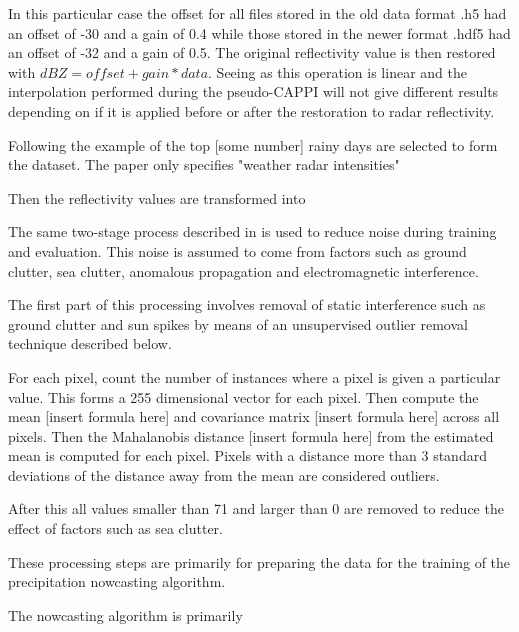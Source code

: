 In this particular case the offset for all files stored in the old data format .h5 had an offset of -30 and a gain of 0.4 while those stored in the newer format .hdf5 had an offset of -32 and a gain of 0.5. The original reflectivity value is then restored with $dBZ = offset + gain * data$. Seeing as this operation is linear and the interpolation performed during the pseudo-CAPPI will not give different results depending on if it is applied before or after the restoration to radar reflectivity.

Following the example of \cite{shi2015convolutional} the top [some number] rainy days are selected to form the dataset. The paper only specifies "weather radar intensities" 

Then the reflectivity  values are transformed into 

The same two-stage process described in \cite{shi2015convolutional} is used to reduce noise during training and evaluation. This noise is assumed to come from factors such as ground clutter, sea clutter, anomalous propagation and electromagnetic interference.

The first part of this processing involves removal of static interference such as ground clutter and sun spikes by means of an unsupervised outlier removal technique described below. 

For each pixel, count the number of instances where a pixel is given a particular value. This forms a 255 dimensional vector for each  pixel. Then compute the mean [insert formula here] and covariance matrix [insert formula here] across all pixels. Then the Mahalanobis distance [insert formula here] from the estimated mean is computed for each pixel. Pixels with a distance more than 3 standard deviations of the distance away from the mean are considered outliers. 

After this all values smaller than 71 and larger than 0 are removed to reduce the effect of factors such as sea clutter.

These processing steps are primarily for preparing the data for the training of the precipitation nowcasting algorithm. 

The nowcasting algorithm is primarily 











